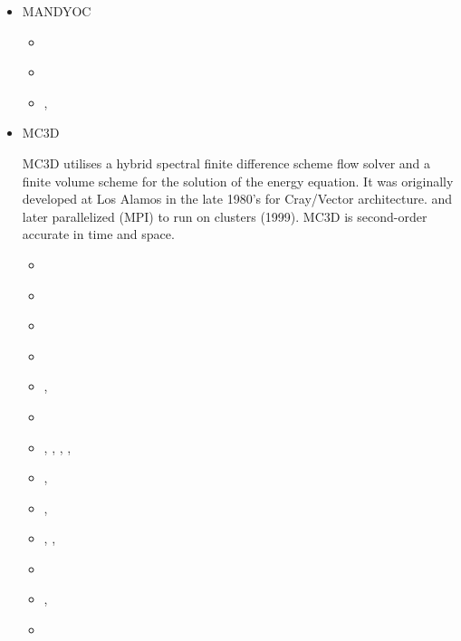 \begin{itemize}
\item MANDYOC 

\begin{scriptsize}
\begin{itemize}
\item[\twothousandseventeen] \textcite{sace17}
\item[\twothousandtwentyone] \textcite{sasa21}
\item[\twothousandtwentytwo] \textcite{saap22}, \textcite{sisa22}
\end{itemize}
\end{scriptsize} 

\item MC3D 

MC3D utilises a hybrid spectral finite difference scheme flow
solver and a finite volume scheme for the solution of the energy equation.
It was originally developed at Los Alamos in the late 1980's for Cray/Vector architecture. 
and later parallelized (MPI) to run on clusters (1999).
MC3D is second-order accurate in time and space.

\begin{scriptsize}
\begin{itemize}
\item[\nineteenninetyone]    \textcite{gaot91}
\item[\nineteenninetynine]   \textcite{loga99}
\item[\twothousandone]       \textcite{lokg01}
\item[\twothousandthree]     \textcite{lokg03}
\item[\twothousandfour]      \textcite{thkl04},  \textcite{lokg04}
\item[\twothousandfive]      \textcite{kogk05} 
\item[\twothousandseven]     \textcite{galo07},  \textcite{galo07b}, \textcite{nelo07},
                             \textcite{jalo07},  \textcite{lopk07}
\item[\twothousandeight]     \textcite{galg08},  \textcite{logg08}
\item[\twothousandten]       \textcite{helo10},  \textcite{oflo10}
\item[\twothousandeleven]    \textcite{stfl11},  \textcite{helo11},  \textcite{lokt11}
\item[\twothousandfourteen]  \textcite{trhs14}
\item[\twothousandfifteen]   \textcite{tosn15},  \textcite{hels15}
\item[\twothousandsixteen]   \textcite{trlo16}
\end{itemize}
\end{scriptsize} 


\end{itemize}
